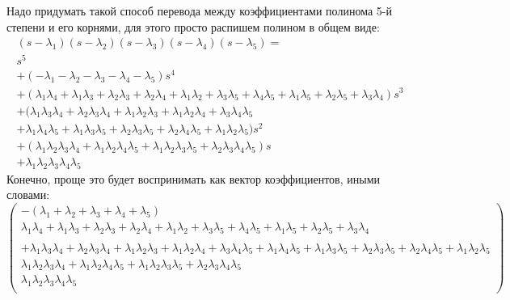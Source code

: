 Надо придумать такой способ перевода между коэффициентами полинома 5-й степени и его корнями, для этого просто распишем полином в общем виде:
\small
$$
\begin{aligned}
  (s-\lambda_1)(s-\lambda_2)(s-\lambda_3)(s-\lambda_4)(s-\lambda_5) = \\
  s^5 
  \\+ (-\lambda_1-\lambda_2-\lambda_3-\lambda_4-\lambda_5)s^4  
  \\+ (\lambda_1\lambda_4 + \lambda_1\lambda_3 + \lambda_2\lambda_3 + \lambda_2\lambda_4 + \lambda_1\lambda_2 + \lambda_3\lambda_5 + \lambda_4\lambda_5 + \lambda_1\lambda_5+ \lambda_2\lambda_5 + \lambda_3\lambda_4)s^3 
  \\+ (\lambda_1\lambda_3\lambda_4 + \lambda_2\lambda_3\lambda_4 + \lambda_1\lambda_2\lambda_3 + \lambda_1\lambda_2\lambda_4+ \lambda_3\lambda_4\lambda_5 \\
    + \lambda_1\lambda_4\lambda_5 + \lambda_1\lambda_3\lambda_5 + \lambda_2\lambda_3\lambda_5 + \lambda_2\lambda_4\lambda_5 + \lambda_1\lambda_2\lambda_5)s^2 
  \\+ (\lambda_1\lambda_2\lambda_3\lambda_4 + \lambda_1\lambda_2\lambda_4\lambda_5 + \lambda_1\lambda_2\lambda_3\lambda_5 + \lambda_2\lambda_3\lambda_4\lambda_5)s 
  \\+ \lambda_1\lambda_2\lambda_3\lambda_4\lambda_5
\end{aligned}
$$
\normalsize
Конечно, проще это будет воспринимать как вектор коэффициентов, иными словами:
\small
$$ 
\begin{pmatrix}
  -(\lambda_1+\lambda_2+\lambda_3+\lambda_4+\lambda_5) \\
  \lambda_1\lambda_4 + \lambda_1\lambda_3 + \lambda_2\lambda_3 + \lambda_2\lambda_4 + \lambda_1\lambda_2 + \lambda_3\lambda_5 + \lambda_4\lambda_5 + \lambda_1\lambda_5+ \lambda_2\lambda_5 + \lambda_3\lambda_4 \\ 
  \\+ \lambda_1\lambda_3\lambda_4 + \lambda_2\lambda_3\lambda_4 + \lambda_1\lambda_2\lambda_3 + \lambda_1\lambda_2\lambda_4+ \lambda_3\lambda_4\lambda_5 + \lambda_1\lambda_4\lambda_5 + \lambda_1\lambda_3\lambda_5 + \lambda_2\lambda_3\lambda_5 + \lambda_2\lambda_4\lambda_5 + \lambda_1\lambda_2\lambda_5  \\
  \lambda_1\lambda_2\lambda_3\lambda_4 + \lambda_1\lambda_2\lambda_4\lambda_5 + \lambda_1\lambda_2\lambda_3\lambda_5 + \lambda_2\lambda_3\lambda_4\lambda_5 \\
  \lambda_1\lambda_2\lambda_3\lambda_4\lambda_5 \\
\end{pmatrix}
$$
\normalsize

